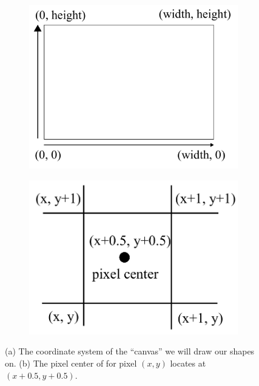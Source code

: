 \begin{figure}[h]
    \centering
    \begin{subfigure}[t]{0.4\linewidth}
        \centering
        \includegraphics[width=\linewidth]{imgs/canvas.pdf}
        \caption{\label{fig:canvas}}
    \end{subfigure}
    \begin{subfigure}[t]{0.4\linewidth}
        \centering
        \includegraphics[width=\linewidth]{imgs/pixel.pdf}
        \caption{\label{fig:pixel}}
    \end{subfigure}
    \caption{(a) The coordinate system of the ``canvas'' we will draw our shapes on. (b) The pixel center of for pixel $(x, y)$ locates at $(x+0.5, y+0.5)$.}
\end{figure}

